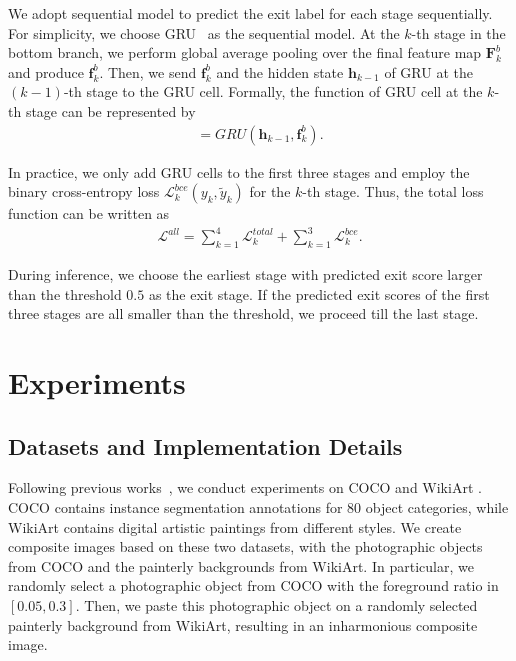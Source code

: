 \documentclass[letterpaper]{article} %
\begin{document}
We adopt sequential model to predict the exit label for each stage sequentially. For simplicity, we choose GRU~\cite{cho2014properties} as the sequential model. At the $k$-th stage in the bottom branch, we perform global average pooling over the final feature map $\bm{F}^b_k$ and produce $\bm{f}^b_k$. Then, we send $\bm{f}^b_k$ and the hidden state $\bm{h}_{k-1}$ of GRU at the $(k\!-\!1)$-th stage to the GRU cell. Formally, the function of GRU cell at the $k$-th stage can be represented by
\begin{eqnarray}
[\tilde{y}_k, \bm{h}_k] = GRU(\bm{h}_{k-1}, \bm{f}^b_k).
\end{eqnarray}

In practice, we only add GRU cells to the first three stages and employ the binary cross-entropy loss $\mathcal{L}^{bce}_k(y_k, \tilde{y}_k)$ for the $k$-th stage. Thus, the total loss function can be written as
\begin{eqnarray}
\mathcal{L}^{all} = \sum_{k=1}^4 \mathcal{L}_k^{total} + \sum_{k=1}^3 \mathcal{L}^{bce}_k.
\end{eqnarray}

During inference, we choose the earliest stage with predicted exit score larger than the threshold $0.5$ as the exit stage. If the predicted exit scores of the first three stages are all smaller than the threshold, we proceed till the last stage.



\section{Experiments}


\subsection{Datasets and Implementation Details} \label{sec:imp_detail}

Following previous works~\cite{peng2019element,cao2022painterly}, we conduct experiments on COCO \cite{lin2014microsoft} and WikiArt \cite{nichol2016painter}.
COCO \cite{lin2014microsoft} contains instance segmentation annotations for 80 object categories, while WikiArt \cite{nichol2016painter} contains digital artistic paintings from different styles.
We create composite images based on these two datasets, with the photographic objects from COCO and the painterly backgrounds from WikiArt.
In particular, we randomly select a photographic object from COCO with the foreground ratio in $[0.05, 0.3]$. Then, we paste this photographic object on a randomly selected painterly background from WikiArt, resulting in an inharmonious composite image. %
\end{document}
